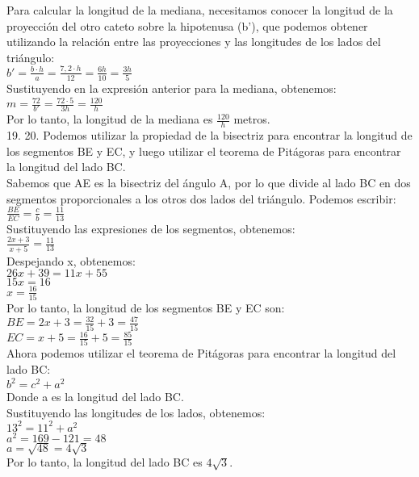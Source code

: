 \documentclass{article}
\begin{document}
Para calcular la longitud de la mediana, necesitamos conocer la longitud de la proyección del otro cateto sobre la hipotenusa (b'), que podemos obtener utilizando la relación entre las proyecciones y las longitudes de los lados del triángulo:\\
$b' = \frac{b \cdot h}{a} = \frac{7,2 \cdot h}{12} = \frac{6h}{10} = \frac{3h}{5}$\\
Sustituyendo en la expresión anterior para la mediana, obtenemos:\\
$m = \frac{72}{b'} = \frac{72 \cdot 5}{3h} = \frac{120}{h}$\\
Por lo tanto, la longitud de la mediana es $\frac{120}{h}$ metros.\\
{\Large 19.}
{\Large 20.}
Podemos utilizar la propiedad de la bisectriz para encontrar la longitud de los segmentos BE y EC, y luego utilizar el teorema de Pitágoras para encontrar la longitud del lado BC.\\
Sabemos que AE es la bisectriz del ángulo A, por lo que divide al lado BC en dos segmentos proporcionales a los otros dos lados del triángulo. Podemos escribir:\\
$\frac{BE}{EC} = \frac{c}{b} = \frac{11}{13}$\\
Sustituyendo las expresiones de los segmentos, obtenemos:\\
$\frac{2x+3}{x+5} = \frac{11}{13}$\\
Despejando x, obtenemos:\\
$26x + 39 = 11x + 55$\\
$15x = 16$\\
$x = \frac{16}{15}$\\
Por lo tanto, la longitud de los segmentos BE y EC son:\\
$BE = 2x+3 = \frac{32}{15} + 3 = \frac{47}{15}$\\
$EC = x+5 = \frac{16}{15} + 5 = \frac{85}{15}$\\
Ahora podemos utilizar el teorema de Pitágoras para encontrar la longitud del lado BC:\\
$b^2 = c^2 + a^2$\\
Donde a es la longitud del lado BC.\\
Sustituyendo las longitudes de los lados, obtenemos:\\
$13^2 = 11^2 + a^2$\\
$a^2 = 169 - 121 = 48$\\
$a = \sqrt{48} = 4\sqrt{3}$\\
Por lo tanto, la longitud del lado BC es $4\sqrt{3}$.\\
\end{document}
